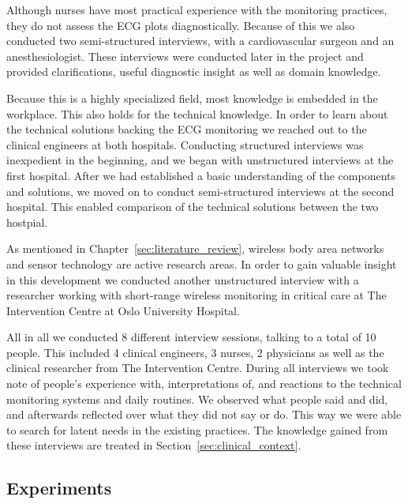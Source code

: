 Although nurses have most practical experience with the monitoring practices, they do not assess the ECG plots diagnostically. Because of this we also conducted two semi-structured interviews, with a cardiovascular surgeon and an anesthesiologist. These interviews were conducted later in the project and provided clarifications, useful diagnostic insight as well as domain knowledge.

Because this is a highly specialized field, most knowledge is embedded in the workplace. This also holds for the technical knowledge. In order to learn about the technical solutions backing the ECG monitoring we reached out to the clinical engineers at both hospitals. Conducting structured interviews was inexpedient in the beginning, and we began with unstructured interviews at the first hospital. After we had established a basic understanding of the components and solutions, we moved on to conduct semi-structured interviews at the second hospital. This enabled comparison of the technical solutions between the two hostpial.

As mentioned in Chapter~\ref{sec:literature_review}, wireless body area networks and sensor technology are active research areas. In order to gain valuable insight in this development we conducted another unstructured interview with a researcher working with short-range wireless monitoring in critical care at The Intervention Centre at Oslo University Hospital.

All in all we conducted 8 different interview sessions, talking to a total of 10 people. This included 4 clinical engineers, 3 nurses, 2 physicians as well as the clinical researcher from The Intervention Centre. During all interviews we took note of people's experience with, interpretations of, and reactions to the technical monitoring systems and daily routines. We observed what people said and did, and afterwards reflected over what they did not say or do. This way we were able to search for latent needs in the existing practices. The knowledge gained from these interviews are treated in  Section~\ref{sec:clinical_context}.


\subsection{Experiments} %
\label{sub:experiments}


